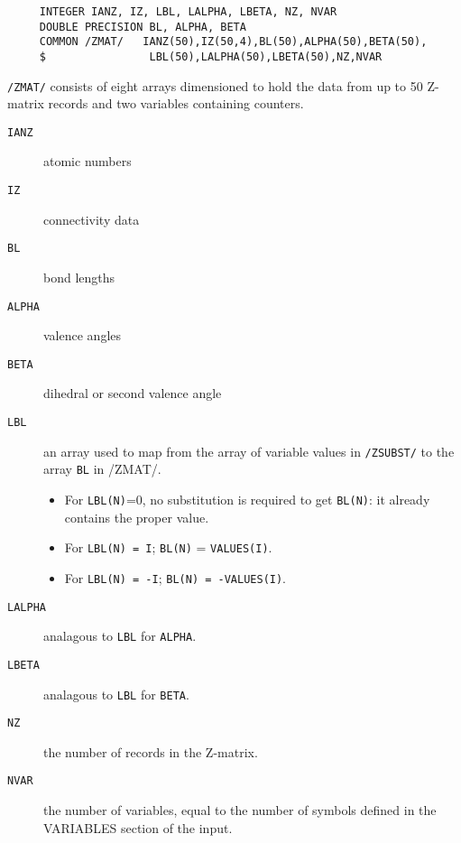 \subsubsection{}
\begin{verbatim}
     INTEGER IANZ, IZ, LBL, LALPHA, LBETA, NZ, NVAR
     DOUBLE PRECISION BL, ALPHA, BETA 
     COMMON /ZMAT/   IANZ(50),IZ(50,4),BL(50),ALPHA(50),BETA(50),
     $                LBL(50),LALPHA(50),LBETA(50),NZ,NVAR
\end{verbatim}
{\tt /ZMAT/} consists of eight arrays dimensioned to hold the
data from up to 50 Z-matrix records and two
variables containing counters.
\begin{description}
\item[{\tt IANZ}]   atomic numbers
\item[{\tt IZ}]     connectivity data
\item[{\tt BL}]     bond lengths
\item[{\tt ALPHA}]  valence angles
\item[{\tt BETA}]   dihedral or second valence angle
\item[{\tt LBL}]    an array used to map from the array of
variable values in {\tt /ZSUBST/} to the array
{\tt BL} in /ZMAT/.   
\begin{itemize}
\item For {\tt LBL(N)}=0, no
substitution is required to get {\tt BL(N)}:
it already contains the proper value.
\item For {\tt LBL(N) = I}; {\tt BL(N)} = {\tt VALUES(I)}.
\item  For
{\tt LBL(N) = -I}; {\tt BL(N) = -VALUES(I)}.
\end{itemize}
\item[{\tt LALPHA}]  analagous to {\tt LBL} for {\tt ALPHA}.
\item[{\tt LBETA}]   analagous to {\tt LBL} for {\tt BETA}.
\item[{\tt NZ}]      the number of records in the Z-matrix.
\item[{\tt NVAR}]    the number of variables, equal to the
number of symbols defined in the
VARIABLES section of the input.
\end{description}
